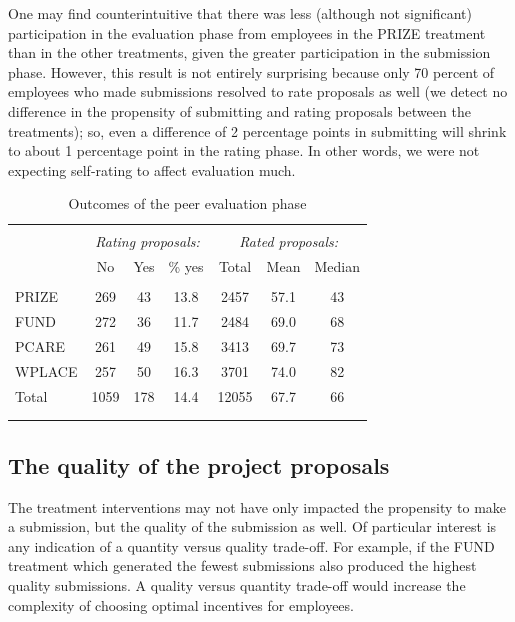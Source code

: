 \documentclass[12pt, titlepage]{article}
\begin{document}
One may find counterintuitive that there was less (although not
significant) participation in the evaluation phase from employees in the
PRIZE treatment than in the other treatments, given the greater
participation in the submission phase. However, this result is not
entirely surprising because only 70 percent of employees who made
submissions resolved to rate proposals as well (we detect no difference
in the propensity of submitting and rating proposals between the
treatments); so, even a difference of 2 percentage points in submitting
will shrink to about 1 percentage point in the rating phase. In other
words, we were not expecting self-rating to affect evaluation much.

\begin{table}
\centering
\caption{Outcomes of the peer evaluation phase}
\label{tab: ratings}
\begin{tabular}{@{}lcccccc}
  \\[-1.8ex]\hline \hline \\[-1.8ex]
 & \multicolumn{3}{c}{\emph{Rating proposals:}} &         \multicolumn{3}{c}{\emph{Rated proposals:}} \\
 \cmidrule(lr){2-4}\cmidrule(lr){5-7} & No & Yes & \% yes & Total & Mean & Median \\ 
  \hline \\[-1.86ex]
PRIZE & 269 & 43 & 13.8 & 2457 & 57.1 & 43 \\ 
  FUND & 272 & 36 & 11.7 & 2484 & 69.0 & 68 \\ 
  PCARE & 261 & 49 & 15.8 & 3413 & 69.7 & 73 \\ 
  WPLACE & 257 & 50 & 16.3 & 3701 & 74.0 & 82 \\ 
  [1.8ex] Total & 1059 & 178 & 14.4 & 12055 & 67.7 & 66 \\ 
   \\[-1.8ex]\hline \hline \\[-1.8ex]
\end{tabular}
\end{table}

\subsection{The quality of the project
proposals}\label{the-quality-of-the-project-proposals}

The treatment interventions may not have only impacted the propensity to
make a submission, but the quality of the submission as well. Of
particular interest is any indication of a quantity versus quality
trade-off. For example, if the FUND treatment which generated the fewest
submissions also produced the highest quality submissions. A quality
versus quantity trade-off would increase the complexity of choosing
optimal incentives for employees.
\end{document}
